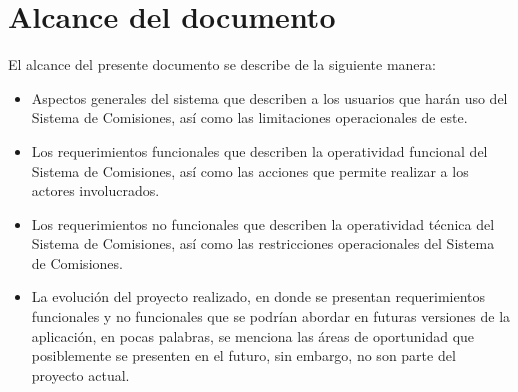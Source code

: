 \section{Alcance del documento}

El alcance del presente documento se describe de la siguiente manera:
\begin{itemize} 
	
	\item Aspectos generales del sistema que describen a los usuarios que harán uso del Sistema de Comisiones, así como las limitaciones operacionales de este.
	\item Los requerimientos funcionales que describen la operatividad funcional del Sistema de Comisiones, así como las acciones que permite realizar a los actores involucrados.
	\item Los requerimientos no funcionales que describen la operatividad técnica del Sistema de Comisiones, así como las restricciones operacionales del Sistema de Comisiones.
	\item La evolución del proyecto realizado, en donde se presentan requerimientos funcionales y no funcionales que se podrían abordar en futuras versiones de la aplicación, en pocas palabras, se menciona las áreas de oportunidad que posiblemente se presenten en el futuro, sin embargo, no son parte del proyecto actual.
\end{itemize}

